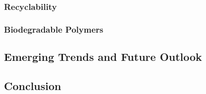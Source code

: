 \subsubsection{Recyclability}

\subsubsection{Biodegradable Polymers}

\subsection{Emerging Trends and Future Outlook}

\subsection{Conclusion}

